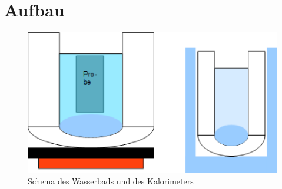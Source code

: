 \section{Aufbau}
\label{sec:Aufbau}

\begin{figure}
	\centering
	\includegraphics[scale = .75,keepaspectratio]
	{content/images/Schema.eps}
	\caption{Schema des Wasserbads und des Kalorimeters}
	\label{fig:Aufbau}
\end{figure}